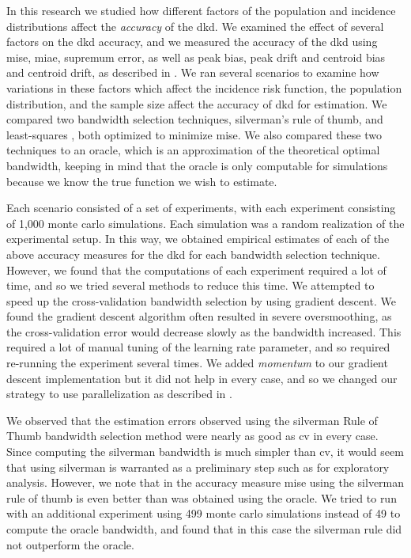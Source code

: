 

In this research we studied how different factors of the population and incidence distributions
affect the \textit{accuracy} of the \gls{dkd}.
We examined the effect of several factors on the \gls{dkd} accuracy,
and we measured the accuracy of the \gls{dkd} using \gls{mise},
\gls{miae}, \gls{supremum error}, as well as \gls{peak bias},
\gls{peak drift} and \gls{centroid bias} and \gls{centroid drift},
as described in .
We ran several scenarios to examine how variations in these factors which affect the incidence risk function,
the population distribution, and the sample size affect the accuracy of \gls{dkd} for estimation.
We compared two bandwidth selection techniques, \gls{silverman}'s rule of thumb,
and least-squares ,
both optimized to minimize \gls{mise}.
We also compared these two techniques to an \gls{oracle},
which is an approximation of the theoretical optimal bandwidth,
keeping in mind that the oracle is only computable for simulations because we know the true function we wish to estimate.

Each scenario consisted of a set of experiments,
with each experiment consisting of 1,000 monte carlo simulations.
Each simulation was a random realization of the experimental setup.
In this way,
we obtained empirical estimates of each of the above accuracy measures for the \gls{dkd}
for each bandwidth selection technique.
However,
we found that the computations of each experiment required a lot of time,
and so we tried several methods to reduce this time.
We attempted to speed up the cross-validation bandwidth selection by using gradient descent.
We found the gradient descent algorithm often resulted in severe oversmoothing,
as the cross-validation error would decrease slowly as the bandwidth increased.
This required a lot of manual tuning of the learning rate parameter,
and so required re-running the experiment several times.
We added \textit{momentum} to our gradient descent implementation but it did not help in every case,
and so we changed our strategy to use parallelization as described in .

We observed that the estimation errors observed using the \gls{silverman} Rule of Thumb bandwidth selection method
were nearly as good as \gls{cv} in every case.
Since computing the \gls{silverman} bandwidth is much simpler than \gls{cv},
it would seem that using \gls{silverman} is warranted as a preliminary step such as for exploratory analysis.
However,
we note that in  the accuracy measure \gls{mise} using the \gls{silverman} rule of thumb is even better than was obtained using the \gls{oracle}.
We tried to run with an additional experiment using 499 monte carlo simulations instead of 49 to compute the oracle bandwidth,
and found that in this case the \gls{silverman} rule did not outperform the \gls{oracle}.

